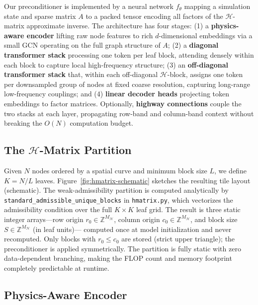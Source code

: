 \documentclass[acmtog,anonymous,review]{acmart}
\begin{document}
Our preconditioner is implemented by a neural network
$f_\theta$ mapping a simulation state and sparse matrix $A$ to a packed tensor encoding all
factors of the $\mathcal{H}$-matrix approximate inverse.  The architecture has four stages:
(1) a \textbf{physics-aware encoder} lifting raw node features to rich $d$-dimensional embeddings
via a small GCN operating on the full graph structure of $A$;
(2) a \textbf{diagonal transformer stack} processing one token per leaf block, attending densely
within each block to capture local high-frequency structure;
(3) an \textbf{off-diagonal transformer stack} that, within each off-diagonal
$\mathcal{H}$-block, assigns one token per downsampled group of nodes at fixed coarse resolution,
capturing long-range low-frequency couplings;
and (4) \textbf{linear decoder heads} projecting token embeddings to factor matrices.
Optionally, \textbf{highway connections} couple the two stacks at each layer, propagating
row-band and column-band context without breaking the $O(N)$ computation budget.

\subsection{The \texorpdfstring{$\mathcal{H}$}{H}-Matrix Partition}
\label{sec:method:hmatrix}

Given $N$ nodes ordered by a spatial curve and minimum block size $L$, we define $K = N/L$
leaves.  Figure~\ref{fig:hmatrix-schematic} sketches the resulting tile layout (schematic).
The weak-admissibility partition is computed analytically by
\texttt{standard\_admissible\_unique\_blocks} in \texttt{hmatrix.py}, which vectorizes the
admissibility condition over the full $K \times K$ leaf grid.  The result is three static integer
arrays---row origin $r_0 \in \mathbb{Z}^{M_\mathcal{H}}$, column origin $c_0 \in
\mathbb{Z}^{M_\mathcal{H}}$, and block size $S \in \mathbb{Z}^{M_\mathcal{H}}$ (in leaf units)---
computed once at model initialization and never recomputed.  Only blocks with $r_0 \leq c_0$ are
stored (strict upper triangle); the preconditioner is applied symmetrically.  The partition is
fully static with zero data-dependent branching, making the FLOP count and memory footprint
completely predictable at runtime.

\subsection{Physics-Aware Encoder}
\label{sec:method:encoder}
\end{document}

